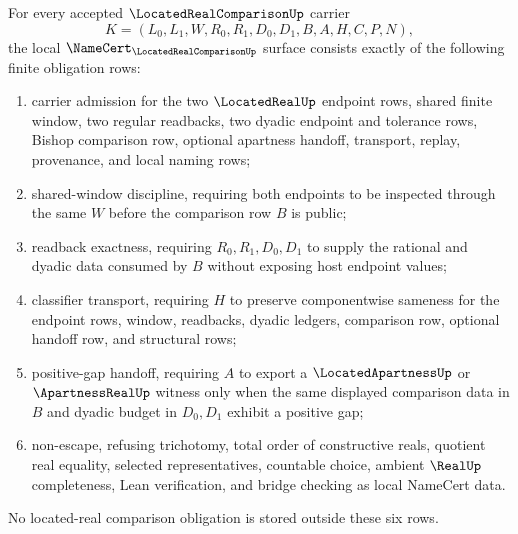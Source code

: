 \begin{theorem}
\label{thm:located-real-comparison-namecert-obligations}
For every accepted $\LocatedRealComparisonUp$ carrier
$$
K=(L_0,L_1,W,R_0,R_1,D_0,D_1,B,A,H,C,P,N),
$$
the local $\NameCert_{\LocatedRealComparisonUp}$ surface consists exactly of the following finite obligation rows:
\begin{enumerate}
\item carrier admission for the two $\LocatedRealUp$ endpoint rows, shared finite window, two regular readbacks, two dyadic endpoint and tolerance rows, Bishop comparison row, optional apartness handoff, transport, replay, provenance, and local naming rows;
\item shared-window discipline, requiring both endpoints to be inspected through the same $W$ before the comparison row $B$ is public;
\item readback exactness, requiring $R_0,R_1,D_0,D_1$ to supply the rational and dyadic data consumed by $B$ without exposing host endpoint values;
\item classifier transport, requiring $H$ to preserve componentwise sameness for the endpoint rows, window, readbacks, dyadic ledgers, comparison row, optional handoff row, and structural rows;
\item positive-gap handoff, requiring $A$ to export a $\LocatedApartnessUp$ or $\ApartnessRealUp$ witness only when the same displayed comparison data in $B$ and dyadic budget in $D_0,D_1$ exhibit a positive gap;
\item non-escape, refusing trichotomy, total order of constructive reals, quotient real equality, selected representatives, countable choice, ambient $\RealUp$ completeness, Lean verification, and bridge checking as local NameCert data.
\end{enumerate}
No located-real comparison obligation is stored outside these six rows.
\end{theorem}
